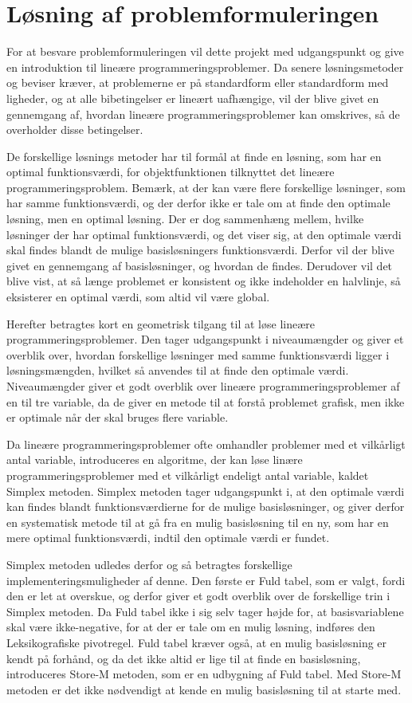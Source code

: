 \section{Løsning af problemformuleringen}
For at besvare problemformuleringen vil dette projekt med udgangspunkt \citep{bert} og \citep{lay} give en introduktion til lineære programmeringsproblemer. 
Da senere løsningsmetoder og beviser kræver, at problemerne er på standardform eller standardform med ligheder, og at alle bibetingelser er lineært uafhængige, vil der blive givet en gennemgang af, hvordan lineære programmeringsproblemer kan omskrives, så de overholder disse betingelser.

De forskellige løsnings metoder har til formål at finde en løsning, som har en optimal funktionsværdi, for objektfunktionen tilknyttet det lineære programmeringsproblem.
Bemærk, at der kan være flere forskellige løsninger, som har samme funktionsværdi, og der derfor ikke er tale om at finde den optimale løsning, men en optimal løsning. 
Der er dog sammenhæng mellem, hvilke løsninger der har optimal funktionsværdi, og det viser sig, at den optimale værdi skal findes blandt de mulige basisløsningers funktionsværdi. 
Derfor vil der blive givet en gennemgang af basisløsninger, og hvordan de findes.
Derudover vil det blive vist, at så længe problemet er konsistent og ikke indeholder en halvlinje, så eksisterer en optimal værdi, som altid vil være global.

Herefter betragtes kort en geometrisk tilgang til at løse lineære programmeringsproblemer.
Den tager udgangspunkt i niveaumængder og giver et overblik over, hvordan forskellige løsninger med samme funktionsværdi ligger i løsningsmængden, hvilket så anvendes til at finde den optimale værdi. 
Niveaumængder giver et godt overblik over lineære programmeringsproblemer af en til tre variable, da de giver en metode til at forstå problemet grafisk, men ikke er optimale når der skal bruges flere variable.

Da lineære programmeringsproblemer ofte omhandler problemer med et vilkårligt antal variable, introduceres en algoritme, der kan løse linære programmeringsproblemer med et vilkårligt endeligt antal variable, kaldet Simplex metoden.
Simplex metoden tager udgangspunkt i, at den optimale værdi kan findes blandt funktionsværdierne for de mulige basisløsninger, og giver derfor en systematisk metode til at gå fra en mulig basisløsning til en ny, som har en mere optimal funktionsværdi, indtil den optimale værdi er fundet.

Simplex metoden udledes derfor og så betragtes forskellige implementeringsmuligheder af denne.
Den første er Fuld tabel, som er valgt, fordi den er let at overskue, og derfor giver et godt overblik over de forskellige trin i Simplex metoden.
Da Fuld tabel ikke i sig selv tager højde for, at basisvariablene skal være ikke-negative, for at der er tale om en mulig løsning, indføres den Leksikografiske pivotregel.
Fuld tabel kræver også, at en mulig basisløsning er kendt på forhånd, og da det ikke altid er lige til at finde en basisløsning, introduceres Store-M metoden, som er en udbygning af Fuld tabel.
Med Store-M metoden er det ikke nødvendigt at kende en mulig basisløsning til at starte med.

